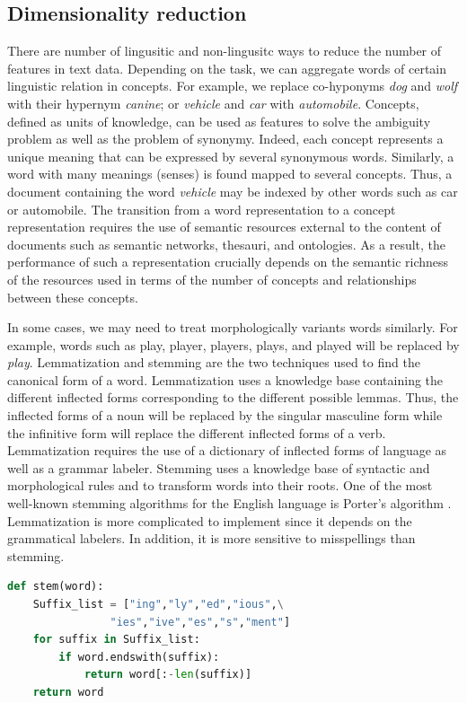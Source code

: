 \subsection{Dimensionality reduction}

There are number of lingusitic and non-lingusitc ways to reduce the number of features in text data. Depending on the task, we can aggregate words of certain linguistic relation in concepts. For example, we replace co-hyponyms \emph{dog} and \emph{wolf} with their hypernym \emph{canine}; or \emph{vehicle} and \emph{car} with \emph{automobile}. Concepts, defined as units of knowledge, can be used as features to solve the ambiguity problem as well as the problem of synonymy. Indeed, each concept represents a unique meaning that can be expressed by several synonymous words. Similarly, a word with many meanings (senses) is found mapped to several concepts. Thus, a document containing the word \emph{vehicle} may be indexed by other words such as car or automobile. The transition from a word representation to a concept representation requires the use of semantic resources external to the content of documents such as semantic networks, thesauri, and ontologies. As a result, the performance of such a representation crucially depends on the semantic richness of the resources used in terms of the number of concepts and relationships between these concepts. 

In some cases, we may need to treat morphologically variants words similarly. For example, words such as play, player, players, plays, and played will be replaced by \emph{play}. Lemmatization and stemming are the two techniques used to find the canonical form of a word. Lemmatization uses a knowledge base containing the different inflected forms corresponding to the different possible lemmas. Thus, the inflected forms of a noun will be replaced by the singular masculine form while the infinitive form will replace the different inflected forms of a verb. Lemmatization requires the use of a dictionary of inflected forms of language as well as a grammar labeler. Stemming uses a knowledge base of syntactic and morphological rules and to transform words into their roots. One of the most well-known stemming algorithms for the English language is Porter's algorithm \citep{porter1980algorithm}. Lemmatization is more complicated to implement since it depends on the grammatical labelers. In addition, it is more sensitive to misspellings than stemming.

\begin{lstlisting}[language=Python, caption=An example of simple Stemmer Written in Python]
def stem(word):
    Suffix_list = ["ing","ly","ed","ious",\
                "ies","ive","es","s","ment"]
    for suffix in Suffix_list:
        if word.endswith(suffix):
            return word[:-len(suffix)]
    return word
\end{lstlisting}

